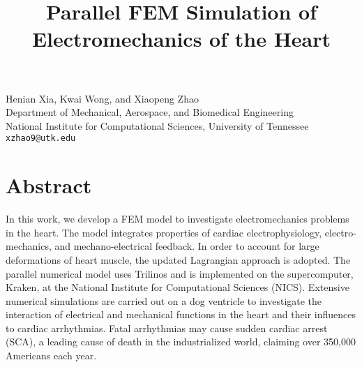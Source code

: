 \title{Parallel FEM Simulation of Electromechanics of the Heart}
\author{} \institute{}
\maketitle

\begin{center}
{\large Henian Xia, Kwai Wong, and Xiaopeng Zhao}\\
Department of Mechanical, Aerospace, and Biomedical Engineering\\
National Institute for Computational Sciences, University of Tennessee\\
{\tt xzhao9@utk.edu}
\end{center}

\section*{Abstract}
In this work, we develop a FEM model to investigate electromechanics problems in the heart. The model integrates properties of cardiac electrophysiology, electro-mechanics, and mechano-electrical feedback. In order to account for large deformations of heart muscle, the updated Lagrangian approach is adopted. The parallel numerical model uses Trilinos and is implemented on the supercomputer, Kraken, at the National Institute for Computational Sciences (NICS).
Extensive numerical simulations are carried out on a dog ventricle to investigate the interaction of electrical and mechanical functions in the heart and their influences to cardiac arrhythmias.
Fatal arrhythmias may cause sudden cardiac arrest (SCA), a leading cause of death in the industrialized world, claiming over 350,000 Americans each year.